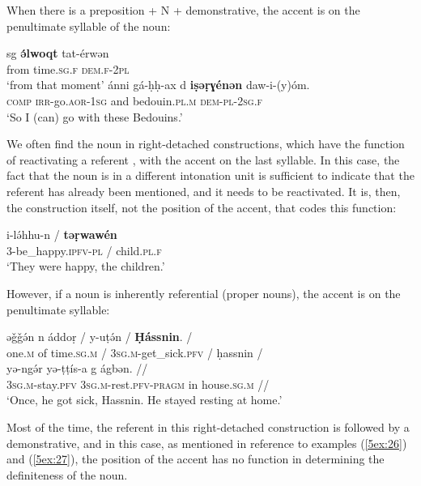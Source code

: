 \documentclass[output=paper]{langsci/langscibook}
\begin{document}
When there is a preposition + N + demonstrative, the accent is on the penultimate syllable of the noun:

\begin{exe}
\ex\label{5ex:28}
\gll	sg	{\textbf{ə́lwoqt}}	tat-érwən \\
	from	time.{\textsc{sg.f}}	{\textsc{dem.f-2pl}} \\
\glt	`from that moment'
\ex\label{5ex:29}
\gll	ánni	gá-ḥḥ-ax	d	{\textbf{iṣəṛɣénən}}	daw-i-(y)óm. \\
	{\textsc{comp}}	{\textsc{irr}}-go.{\textsc{aor-1sg}}	and	bedouin.{\textsc{pl.m}}	{\textsc{dem-pl-2sg.f}} \\
\glt	`So I (can) go with these Bedouins.'
\end{exe}

We often find the noun in right-detached constructions, which have the function of reactivating a referent \citep[][280]{mettouchi:schiattarella:18}, with the accent on the last syllable. In this case, the fact that the noun is in a different intonation unit is sufficient to indicate that the referent has already been mentioned, and it needs to be reactivated. It is, then, the construction itself, not the position of the accent, that codes this function:

\begin{exe}
\ex\label{5ex:30}
\gll	i-lə́hhu-n	/	{\textbf{təṛwawén}} \\
	3-be\_happy.{\textsc{ipfv-pl}}	/	child.{\textsc{pl.f}} \\
\glt	`They were happy, the children.'
\end{exe}

However, if a noun is inherently referential (proper nouns), the accent is on the penultimate syllable:

\begin{exe}
\ex\label{5ex:31}
\gll	əǧǧə́n	n	áddoṛ	/	y-uṭə́n	/	{\textbf{Ḥássnin}}.	/ \\
	one.{\textsc{m}}	of	time.{\textsc{sg.m}}	/	{\textsc{3sg.m}}-get\_sick.{\textsc{pfv}}	/	ḥassnin	/ \\
\glt
\exi{}
\gll	yə-ngə́r	yə-ṭṭís-a	g	ágbən.	// \\
	{\textsc{3sg.m}}-stay.{\textsc{pfv}}	{\textsc{3sg.m}}-rest.{\textsc{pfv-pragm}}	in	house.{\textsc{sg.m}}	// \\
\glt	`Once, he got sick, Hassnin. He stayed resting at home.'
\end{exe}

Most of the time, the referent in this right-detached construction is followed by a demonstrative, and in this case, as mentioned in reference to examples (\ref{5ex:26}) and (\ref{5ex:27}), the position of the accent has no function in determining the definiteness of the noun.
\end{document}
